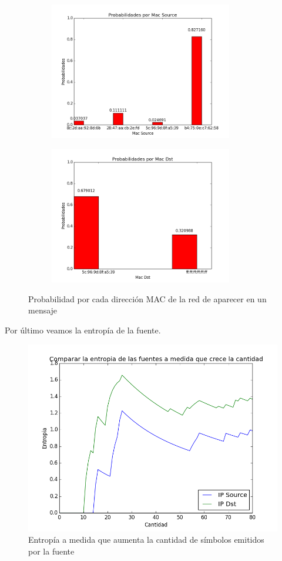 \begin{figure}[H]
\begin{subfigure}{0.6\textwidth}
\includegraphics[width=0.9\linewidth, height=6cm]{imagenes/exp1/11probabilidadMacSource}
\caption{}
\end{subfigure}
\begin{subfigure}{0.6\textwidth}
\includegraphics[width=0.9\linewidth, height=6cm]{imagenes/exp1/12probabilidadMacDst}
\caption{}
\end{subfigure}
\caption{Probabilidad por cada direcci\'on MAC de la red de aparecer en un mensaje}
\label{fig:1}
\end{figure}

\newpage

Por \'ultimo veamos la entrop\'ia de la fuente.

\begin{figure}[h!]
\centering
\includegraphics[width=0.7\linewidth]{imagenes/exp1/8entropiaIPDstyIPSource}
\caption{Entrop\'ia a medida que aumenta la cantidad de s\'imbolos emitidos por la fuente}
\label{exp1grafico1}
\end{figure}

